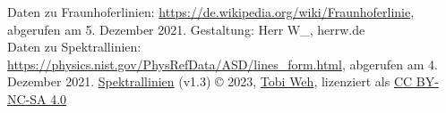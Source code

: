 \documentclass{article}
\begin{document}



\vfill
Daten zu Fraunhoferlinien: \url{https://de.wikipedia.org/wiki/Fraunhoferlinie},
  abgerufen am 5. Dezember 2021.
\hfill
Gestaltung: Herr W\_, herrw.de\\
Daten zu Spektrallinien: \url{https://physics.nist.gov/PhysRefData/ASD/lines_form.html},
  abgerufen am 4. Dezember 2021.
\hfill
\href{https://github.com/tweh/spektrallinien}{Spektrallinien} (v1.3) © 2023, \href{https://herrw.de}{Tobi Weh}, lizenziert als \href{http://creativecommons.org/licenses/by-nc-sa/4.0/}
  {CC BY-NC-SA 4.0} \raisebox{0.17ex}{\ccbyncsa}
\end{document}
